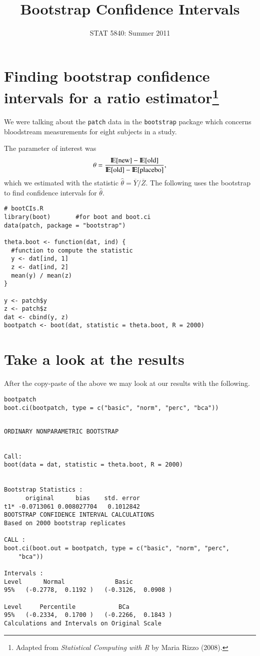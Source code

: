 \documentclass[11pt,english]{article}
\title{Bootstrap Confidence Intervals}
\date{STAT 5840: Summer 2011}
\begin{document}
\maketitle

\thispagestyle{empty}

\section*{Finding bootstrap confidence intervals for a ratio estimator\protect\footnote{Adapted from \emph{Statistical Computing with R} by Maria Rizzo (2008). }}
\label{sec-1}

We were talking about the \texttt{patch} data in the \texttt{bootstrap} package which concerns bloodstream measurements for eight subjects in a study. 


The parameter of interest was
\[
\theta = \frac{\mathrm{I\hspace{-1.5pt}E}[\mathrm{new}] - \mathrm{I\hspace{-1.5pt}E}[\mathrm{old}]}{\mathrm{I\hspace{-1.5pt}E}[\mathrm{old}] - \mathrm{I\hspace{-1.5pt}E}[\mathrm{placebo}]},
\]
which we estimated with the statistic \(\hat{\theta} = \overline{Y}/\overline{Z}\).  The following uses the bootstrap to find confidence intervals for $\hat{\theta}$.

\begin{verbatim}
# bootCIs.R
library(boot)       #for boot and boot.ci
data(patch, package = "bootstrap")

theta.boot <- function(dat, ind) {
  #function to compute the statistic
  y <- dat[ind, 1]
  z <- dat[ind, 2]
  mean(y) / mean(z)
}

y <- patch$y
z <- patch$z
dat <- cbind(y, z)
bootpatch <- boot(dat, statistic = theta.boot, R = 2000)
\end{verbatim}
\section*{Take a look at the results}
\label{sec-2}

After the copy-paste of the above we may look at our results with the following.
\begin{verbatim}
bootpatch
boot.ci(bootpatch, type = c("basic", "norm", "perc", "bca"))
\end{verbatim}

\begin{verbatim}

ORDINARY NONPARAMETRIC BOOTSTRAP


Call:
boot(data = dat, statistic = theta.boot, R = 2000)


Bootstrap Statistics :
      original      bias    std. error
t1* -0.0713061 0.008027704   0.1012842
BOOTSTRAP CONFIDENCE INTERVAL CALCULATIONS
Based on 2000 bootstrap replicates

CALL : 
boot.ci(boot.out = bootpatch, type = c("basic", "norm", "perc", 
    "bca"))

Intervals : 
Level      Normal              Basic         
95%   (-0.2778,  0.1192 )   (-0.3126,  0.0908 )  

Level     Percentile            BCa          
95%   (-0.2334,  0.1700 )   (-0.2266,  0.1843 )  
Calculations and Intervals on Original Scale
\end{verbatim}
\end{document}
